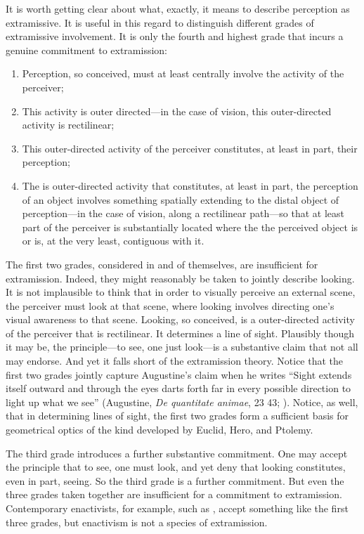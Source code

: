 \documentclass[12pt]{article}
\begin{document}
It is worth getting clear about what, exactly, it means to describe perception as extramissive. It is useful in this regard to distinguish different grades of extramissive involvement. It is only the fourth and highest grade that incurs a genuine commitment to extramission:
\begin{enumerate}[(1)]
	\item Perception, so conceived, must at least centrally involve the activity of the perceiver;
	\item This activity is outer directed---in the case of vision, this outer-directed activity is rectilinear;
	\item This outer-directed activity of the perceiver constitutes, at least in part, their perception;
	\item The is outer-directed activity that constitutes, at least in part, the perception of an object involves something spatially extending to the distal object of perception---in the case of vision, along a rectilinear path---so that at least part of the perceiver is substantially located where the the perceived object is or is, at the very least, contiguous with it.
\end{enumerate}

The first two grades, considered in and of themselves, are insufficient for extramission. Indeed, they might reasonably be taken to jointly describe looking. It is not implausible to think that in order to visually perceive an external scene, the perceiver must look at that scene, where looking involves directing one's visual awareness to that scene. Looking, so conceived, is a outer-directed activity of the perceiver that is rectilinear. It determines a line of sight. Plausibly though it may be, the principle---to see, one just look---is a substantive claim that not all may endorse. And yet it falls short of the extramission theory. Notice that the first two grades jointly capture Augustine's claim when he writes ``Sight extends itself outward and through the eyes darts forth far in every possible direction to light up what we see'' (Augustine, \emph{De quantitate animae}, 23 43; \citealt[66]{Colleran:1949ys}). Notice, as well, that in determining lines of sight, the first two grades form a sufficient basis for geometrical optics of the kind developed by Euclid, Hero, and Ptolemy. 

The third grade introduces a further substantive commitment. One may accept the principle that to see, one must look, and yet deny that looking constitutes, even in part, seeing. So the third grade is a further commitment. But even the three grades taken together are insufficient for a commitment to extramission. Contemporary enactivists, for example, such as \citet{Noe:2004fk}, accept something like the first three grades, but enactivism is not a species of extramission.
\end{document}
